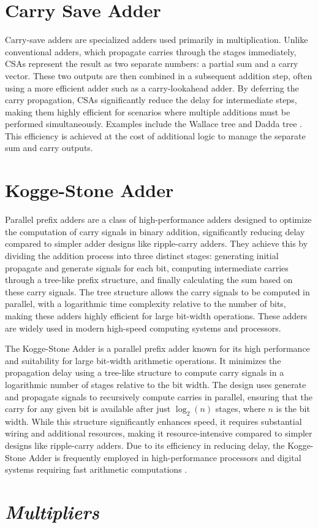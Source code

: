 \section{Carry Save Adder}
Carry-save adders are specialized adders used primarily in multiplication. Unlike conventional adders, which propagate carries through the stages immediately, CSAs represent the result as two separate numbers: a partial sum and a carry vector. These two outputs are then combined in a subsequent addition step, often using a more efficient adder such as a carry-lookahead adder. By deferring the carry propagation, CSAs significantly reduce the delay for intermediate steps, making them highly efficient for scenarios where multiple additions must be performed simultaneously. Examples include the Wallace tree \cite{wallace1964} and Dadda tree \cite{dadda1965}. This efficiency is achieved at the cost of additional logic to manage the separate sum and carry outputs.






\section{Kogge-Stone Adder}
Parallel prefix adders are a class of high-performance adders designed to optimize the computation of carry signals in binary addition, significantly reducing delay compared to simpler adder designs like ripple-carry adders. They achieve this by dividing the addition process into three distinct stages: generating initial propagate and generate signals for each bit, computing intermediate carries through a tree-like prefix structure, and finally calculating the sum based on these carry signals. The tree structure allows the carry signals to be computed in parallel, with a logarithmic time complexity relative to the number of bits, making these adders highly efficient for large bit-width operations. These adders are widely used in modern high-speed computing systems and processors.

The Kogge-Stone Adder is a parallel prefix adder known for its high performance and suitability for large bit-width arithmetic operations. It minimizes the propagation delay using a tree-like structure to compute carry signals in a logarithmic number of stages relative to the bit width. The design uses generate and propagate signals to recursively compute carries in parallel, ensuring that the carry for any given bit is available after just $\log_2(n)$ stages, where $n$ is the bit width. While this structure significantly enhances speed, it requires substantial wiring and additional resources, making it resource-intensive compared to simpler designs like ripple-carry adders. Due to its efficiency in reducing delay, the Kogge-Stone Adder is frequently employed in high-performance processors and digital systems requiring fast arithmetic computations  \cite{kogge1973parallel}.

\section{{\bf {\em Multipliers}}}
